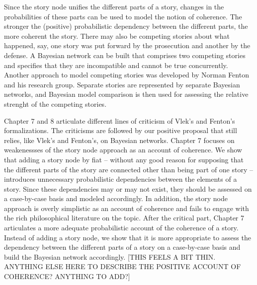 \documentclass[10pt,dvipsnames,enabledeprecatedfontcommands]{scrartcl}
\begin{document}
Since the story node unifies the different parts of a story, changes in
the probabilities of these parts can be used to model the notion of
coherence. The stronger the (positive) probabilistic dependency between
the different parts, the more coherent the story. There may also be
competing stories about what happened, say, one story was put forward by
the prosecution and another by the defense. A Bayesian network can be
built that comprises two competing stories and specifies that they are
incompatible and cannot be true concurrently. Another approach to model
competing stories was developed by Norman Fenton and his research group.
Separate stories are represented by separate Bayesian networks, and
Bayesian model comparison is then used for assessing the relative
strenght of the competing stories.

Chapter 7 and 8 articulate different lines of criticism of Vlek's and
Fenton's formalizations. The criticisms are followed by our positive
proposal that still relies, like Vlek's and Fenton's, on Bayesian
networks. Chapter 7 focuses on weakenessses of the story node approach
as an account of coherence. We show that adding a story node by fiat --
without any good reason for supposing that the different parts of the
story are connected other than being part of one story -- introduces
unnecessary probabilistic dependencies between the elements of a story.
Since these dependencies may or may not exist, they should be assessed
on a case-by-case basis and modeled accordingly. In addition, the story
node approach is overly simplistic as an account of coherence and fails
to engage with the rich philosophical literature on the topic. After the
critical part, Chapter 7 articulates a more adequate probabilistic
account of the coherence of a story. Instead of adding a story node, we
show that it is more appropriate to assess the dependency between the
different parts of a story on a case-by-case basis and build the
Bayesian network accordingly. {[}THIS FEELS A BIT THIN. ANYTHING ELSE
HERE TO DESCRIBE THE POSITIVE ACCOUNT OF COHERENCE? ANYTHING TO ADD?{]}
\end{document}
